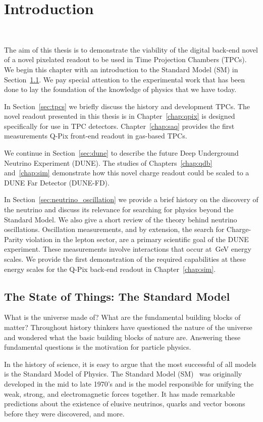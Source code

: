 \chapter{Introduction}~\label{chap:intro}

The aim of this thesis is to demonstrate the viability of the digital back-end novel of a novel pixelated readout to be used in Time Projection Chambers (TPCs). 
We begin this chapter with an introduction to the Standard Model (SM) in Section~\ref{sec:standard_model}.
We pay special attention to the experimental work that has been done to lay the foundation of the knowledge of physics that we have today.

In Section~\ref{sec:tpcs} we briefly discuss the history and development TPCs. 
The novel readout presented in this thesis is in Chapter~\ref{chap:qpix} is designed specifically for use in TPC detectors.
Chapter~\ref{chap:saq} provides the first measurements Q-Pix front-end readout in gas-based TPCs.

We continue in Section~\ref{sec:dune} to describe the future Deep Underground Neutrino Experiment (DUNE).
The studies of Chapters~\ref{chap:qdb} and~\ref{chap:sim} demonstrate how this novel charge readout could be scaled to a DUNE Far Detector (DUNE-FD).

In Section~\ref{sec:neutrino_oscillation} we provide a brief history on the discovery of the neutrino and discuss its relevance for searching for physics beyond the Standard Model.
We also give a short review of the theory behind neutrino oscillations.
Oscillation measurements, and by extension, the search for Charge-Parity violation in the lepton sector, are a primary scientific goal of the DUNE experiment.
These measurements involve interactions that occur at~\unit{GeV} energy scales.
We provide the first demonstration of the required capabilities at these energy scales for the Q-Pix back-end readout in Chapter~\ref{chap:sim}.

\section{The State of Things: The Standard Model}
\label{sec:standard_model}
What is the universe made of?
What are the fundamental building blocks of matter?
Throughout history thinkers have questioned the nature of the universe and wondered what the basic building blocks of nature are.
Answering these fundamental questions is the motivation for particle physics.

In the history of science, it is easy to argue that the most successful of all models is the Standard Model of Physics.
The Standard Model (SM)~\citep{GLASHOW1961579, salam1964electromagnetic, weinberg1967model} was originally developed in the mid to late 1970's and is the model responsible for unifying the weak, strong, and electromagnetic forces together.
It has made remarkable predictions about the existence of elusive neutrinos, quarks and vector bosons before they were discovered, and more.

